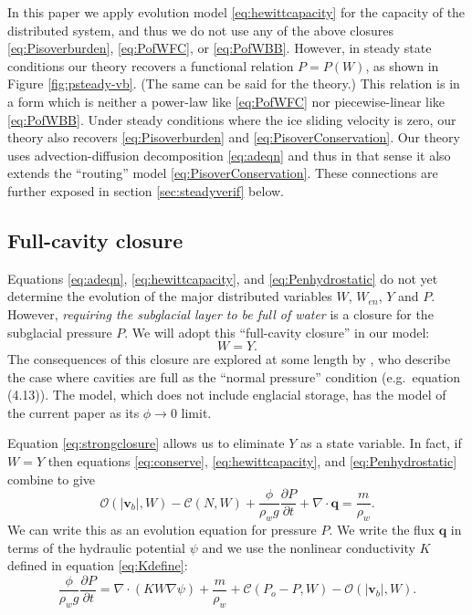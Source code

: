 \documentclass[11pt,final]{amsart}
\newcommand\bv{\mathbf{v}}
\newcommand\bq{\mathbf{q}}
\newcommand{\Div}{\nabla\cdot}
\newcommand{\grad}{\nabla}
\begin{document}
In this paper we apply evolution model \eqref{eq:hewittcapacity} for the capacity of the distributed system, and thus we do not use any of the above closures \eqref{eq:Pisoverburden}, \eqref{eq:PofWFC}, or \eqref{eq:PofWBB}.  However, in steady state conditions our theory recovers a functional relation $P=P(W)$, as shown in Figure \ref{fig:psteady-vb}.  (The same can be said for the \cite{Schoofetal2012} theory.)  This relation is in a form which is neither a power-law like \eqref{eq:PofWFC} nor piecewise-linear like \eqref{eq:PofWBB}.  Under steady conditions where the ice sliding velocity is zero, our theory also recovers \eqref{eq:Pisoverburden} and \eqref{eq:PisoverConservation}.  Our theory uses advection-diffusion decomposition \eqref{eq:adeqn} and thus in that sense it also extends the ``routing'' model \eqref{eq:PisoverConservation}.  These connections are further exposed in section \ref{sec:steadyverif} below.


\subsection*{Full-cavity closure}  Equations  \eqref{eq:adeqn}, \eqref{eq:hewittcapacity}, and \eqref{eq:Penhydrostatic} do not yet determine the evolution of the major distributed variables $W$, $W_{en}$, $Y$ and $P$.  However, \emph{requiring the subglacial layer to be full of water} is a closure for the subglacial pressure $P$.  We will adopt this ``full-cavity closure'' in our model:
\begin{equation}
W = Y.\label{eq:strongclosure}
\end{equation}
The consequences of this closure are explored at some length by \cite{Schoofetal2012}, who describe the case where cavities are full as the ``normal pressure'' condition (e.g.~equation (4.13)).  The \cite{Schoofetal2012} model, which does not include englacial storage, has the model of the current paper as its $\phi\to 0$ limit.

Equation \eqref{eq:strongclosure} allows us to eliminate $Y$ as a state variable.  In fact, if $W=Y$ then equations \eqref{eq:conserve}, \eqref{eq:hewittcapacity}, and \eqref{eq:Penhydrostatic} combine to give
\begin{equation}
\mathcal{O}(|\bv_b|,W) - \mathcal{C}(N,W) + \frac{\phi}{\rho_w g}\frac{\partial P}{\partial t} + \Div \bq = \frac{m}{\rho_w}. \label{eq:initialformpressure}
\end{equation}
We can write this as an evolution equation for pressure $P$.  We write the flux $\bq$ in terms of the hydraulic potential $\psi$ and we use the nonlinear conductivity $K$ defined in equation \eqref{eq:Kdefine}:
\begin{equation}
\frac{\phi}{\rho_w g}\frac{\partial P}{\partial t} = \Div\left(K W \grad \psi\right) + \frac{m}{\rho_w} + \mathcal{C}(P_o-P,W) - \mathcal{O}(|\bv_b|,W). \label{eq:pressureequation}
\end{equation}
\end{document}
